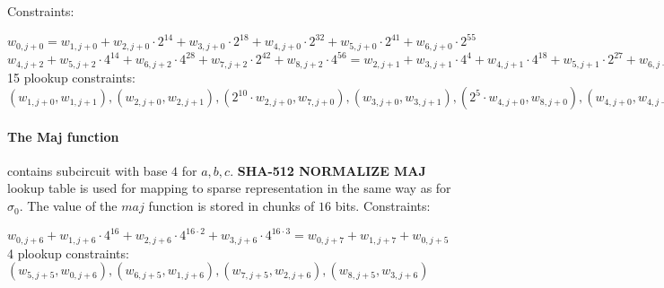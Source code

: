 Constraints:
\begin{center}
    $w_{0, j + 0} = w_{1, j + 0} + w_{2, j + 0} \cdot 2^{14} + w_{3, j + 0} \cdot 2^{18} + w_{4, j + 0} \cdot 2^{32} + w_{5, j + 0} \cdot 2^{41} + w_{6,  j + 0}\cdot 2^{55}$ \\
    $w_{4, j + 2} + w_{5, j + 2} \cdot 4^{14} + w_{6, j + 2} \cdot 4^{28} + w_{7, j + 2} \cdot 2^{42} + w_{8, j + 2} \cdot 4^{56} = w_{2, j + 1} + w_{3, j + 1} \cdot 4^4 + w_{4, j + 1} \cdot 4^{18} + w_{5, j + 1} \cdot 2^{27} + w_{6, j + 1} \cdot 4^{41} + w_{1, j + 1} \cdot 4^{50} + 
     w_{3, j + 1} + w_{4, j + 1} \cdot 4^{14} + w_{5, j + 1} \cdot 4^{23} + w_{6, j + 1} \cdot 2^{37} + w_{1, j + 1} \cdot 4^{46} + w_{3, j + 1} \cdot 4^{60} +
     w_{5, j + 1} + w_{6, j + 1} \cdot 4^{14} + w_{1, j + 1} \cdot 4^{23} + w_{2, j + 1} \cdot 2^{37} + w_{3, j + 1} \cdot 4^{41} + w_{4, j + 1} \cdot 4^{55}$ \\
    15 plookup constraints: $(w_{1, j + 0}, w_{1, j + 1}), (w_{2, j + 0}, w_{2, j + 1}), ( 2^{10} \cdot w_{2, j + 0}, w_{7, j + 0}), (w_{3, j + 0}, w_{3, j + 1}), (2^5 \cdot w_{4, j + 0}, w_{8, j + 0}), (w_{4, j + 0}, w_{4, j + 1}), (w_{5, j + 0}, w_{5, j + 1}), (2^3 \cdot w_{6, j + 0}, w_{7, j + 1}), (w_{6, j + 0}, w_{6, j + 1}), (w_{4, j + 3}, w_{4, j + 2}), (w_{5, j + 3}, w_{5, j + 2}), (w_{6, j + 3}, w_{6, j + 2}), (w_{7, j + 3}, w_{7, j + 2}), (w_{8, j + 3}, w_{8, j + 2}), (2^6 \cdot w_{8, j + 3}, w_{3, j + 2})$
\end{center}

\paragraph{The Maj function}
contains subcircuit with base $4$ for $a, b ,c$.
\textbf{SHA-512 NORMALIZE MAJ} lookup table is used for mapping to sparse representation in the same way as for $\sigma_0$.
The value of the $ maj $ function is stored in chunks of $16$ bits.
Constraints:
\begin{center}
    $w_{0, j + 6} + w_{1, j + 6} \cdot 4^{16} + w_{2, j + 6} \cdot 4^{16 \cdot 2} + w_{3, j + 6} \cdot 4^{16 \cdot 3} = w_{0, j + 7} + w_{1, j + 7} + w_{0, j + 5} $ \\
    4 plookup constraints: $( w_{5, j + 5}, w_{0, j + 6}), ( w_{6, j + 5}, w_{1, j + 6}), (w_{7, j + 5}, w_{2, j + 6}), (w_{8, j + 5}, w_{3, j + 6})$ \\
\end{center}

